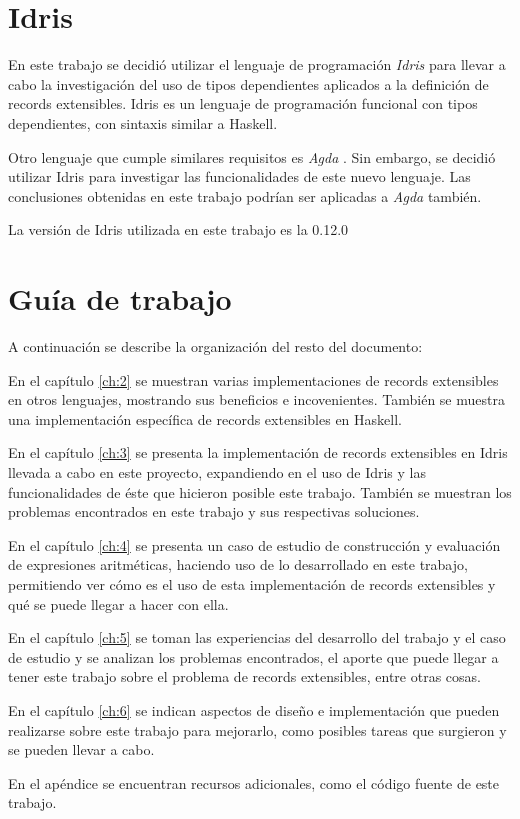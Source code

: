 \section{Idris}

En este trabajo se decidió utilizar el lenguaje de programación \textit{Idris} \cite{brady:idris-jfp13} para llevar a cabo la investigación del uso de tipos dependientes aplicados a la definición de records extensibles. Idris es un lenguaje de programación funcional con tipos dependientes, con sintaxis similar a Haskell.

Otro lenguaje que cumple similares requisitos es \textit{Agda} \cite{Norell:2009:DTP:1481861.1481862}. Sin embargo, se decidió utilizar Idris para investigar las funcionalidades de este nuevo lenguaje. Las conclusiones obtenidas en este trabajo podrían ser aplicadas a \textit{Agda} también.

La versión de Idris utilizada en este trabajo es la 0.12.0

\section{Guía de trabajo}

A continuación se describe la organización del resto del documento:

En el capítulo \ref{ch:2} se muestran varias implementaciones de records extensibles en otros lenguajes, mostrando sus beneficios e incovenientes. También se muestra una implementación específica de records extensibles en Haskell.

En el capítulo \ref{ch:3} se presenta la implementación de records extensibles en Idris llevada a cabo en este proyecto, expandiendo en el uso de Idris y las funcionalidades de éste que hicieron posible este trabajo. También se muestran los problemas encontrados en este trabajo y sus respectivas soluciones.

En el capítulo \ref{ch:4} se presenta un caso de estudio de construcción y evaluación de expresiones aritméticas, haciendo uso de lo desarrollado en este trabajo, permitiendo ver cómo es el uso de esta implementación de records extensibles y qué se puede llegar a hacer con ella.

En el capítulo \ref{ch:5} se toman las experiencias del desarrollo del trabajo y el caso de estudio y se analizan los problemas encontrados, el aporte que puede llegar a tener este trabajo sobre el problema de records extensibles, entre otras cosas.

En el capítulo \ref{ch:6} se indican aspectos de diseño e implementación que pueden realizarse sobre este trabajo para mejorarlo, como posibles tareas que surgieron y se pueden llevar a cabo.

En el apéndice se encuentran recursos adicionales, como el código fuente de este trabajo.

